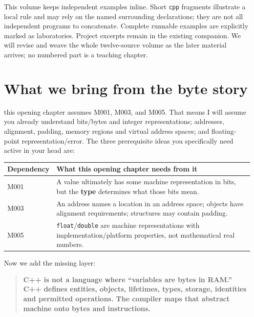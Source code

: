 This volume keeps independent examples inline. Short \texttt{cpp} fragments illustrate a local rule and may rely on the named surrounding declarations; they are not all independent programs to concatenate. Complete runnable examples are explicitly marked as laboratories. Project excerpts remain in the existing companion. We will revise and weave the whole twelve-source volume as the later material arrives; no numbered part is a teaching chapter.

\section{What we bring from the byte story}\label{01-foundations-i-ch002-what-we-bring-from-the-byte-story}

this opening chapter assumes M001, M003, and M005. That means I will assume you already understand bits/bytes and integer representations; addresses, alignment, padding, memory regions and virtual address spaces; and floating-point representation/error. The three prerequisite ideas you specifically need active in your head are:

{\def\LTcaptype{none} %
\begin{longtable}[]{@{}
  >{\raggedright\arraybackslash}p{}
  >{\raggedright\arraybackslash}p{}@{}}
\toprule\noalign{}
\begin{minipage}[b]{\linewidth}\raggedright
Dependency
\end{minipage} & \begin{minipage}[b]{\linewidth}\raggedright
What this opening chapter needs from it
\end{minipage} \\
\midrule\noalign{}
\endhead
\bottomrule\noalign{}
\endlastfoot
M001 & A value ultimately has some machine representation in bits, but the \textbf{type} determines what those bits mean. \\
M003 & An address names a location in an address space; objects have alignment requirements; structures may contain padding. \\
M005 & \texttt{float}/\texttt{double} are machine representations with implementation/platform properties, not mathematical real numbers. \\
\end{longtable}
}

Now we add the missing layer:

\begin{quote}
\textbf{C++ is not a language where ``variables are bytes in RAM.'' C++ defines entities, objects, lifetimes, types, storage, identities and permitted operations. The compiler maps that abstract machine onto bytes and instructions.}
\end{quote}

